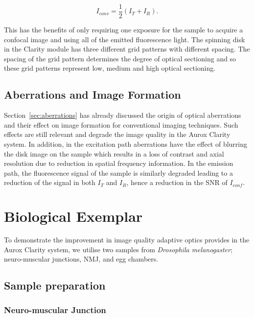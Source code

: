 \begin{equation}\label{eq:conventional_image}
I_{conv} = \frac{1}{2}\left(I_{T} + I_{R}\right).
\end{equation}

This has the benefits of only requiring one exposure for 
the sample to acquire a confocal image and using all of 
the emitted fluorescence light. The spinning disk in the 
Clarity module has three different grid patterns with 
different spacing. The spacing of the grid pattern determines
the degree of optical sectioning and so these grid patterns
represent low, medium and high optical sectioning\cite{neil1997method}.

\subsection{Aberrations and Image Formation}
\label{subsec:Aurox_aberrations}

Section~\ref{sec:aberrations} has already discussed the origin of 
optical aberrations and their effect on image formation for 
conventional imaging techniques. Such effects are still relevant
and degrade the image quality in the Aurox Clarity system. In addition,
in the excitation path aberrations have the effect of blurring the 
disk image on the sample which results in a loss of contrast and 
axial resolution due to reduction in spatial frequency
information\cite{wilson1990confocal, hell1993aberrations}. In the 
emission path, the fluorescence signal of the sample is similarly
degraded leading to a reduction of the signal in both $I_{T}$ and
$I_{R}$, hence a reduction in the SNR of $I_{conf}$. 

\section{Biological Exemplar}
\label{sec:Aurox_biology}

To demonstrate the improvement in image quality adaptive optics
provides in the Aurox Clarity system, we utilise two samples from
\textit{Drosophila melanogaster}; neuro-muscular junctions, NMJ, 
and egg chambers.

\subsection{Sample preparation}
\label{subsec:Aurox_sample_prep}

\subsubsection{Neuro-muscular Junction}
\label{subsubsec:Aurox_NMJ_prep}

